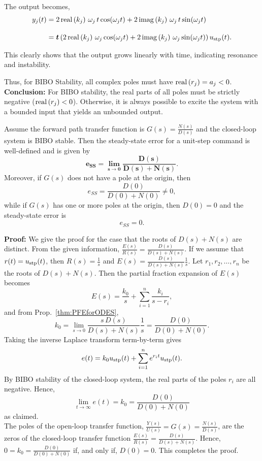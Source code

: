 \begin{itemize}
The output becomes,
\[
\begin{aligned}
y_j(t) &= 2 \, \mathrm{real} \left( k_j \right) \, \omega_j \, t \cos(\omega_j t) + 2 \, \mathrm{imag} \left( k_j \right) \, \omega_j \, t \sin(\omega_j t) \\[1em]
&= \bm{t} \left( 2 \, \mathrm{real} \left( k_j \right) \, \omega_j \cos(\omega_j t) + 2 \, \mathrm{imag} \left( k_j \right) \, \omega_j \sin(\omega_j t) \right) u_{\rm stp}(t).
\end{aligned}
\]

This clearly shows that the output grows linearly with time, indicating resonance and instability.

\end{itemize}



Thus, for BIBO Stability, all complex poles must have \(\mathrm{real} \left( r_j \right) = a_j < 0\).\\

\textbf{Conclusion:} For BIBO stability, the real parts of all poles must be strictly negative (\(\mathrm{real} \left( r_j \right) < 0\)). Otherwise, it is always possible to excite the system with a bounded input that yields an unbounded output.

\Qed

\bigskip

\begin{tcolorbox}[title=\textcolor{black}{Proof of Prop.~\ref{thm:ESS} (Steady-State Error for Step Inputs Applied to BIBO Stable Closed-Loop Systems)}, sharp corners, colback=green!30, colframe=green!80!blue, breakable, fonttitle=\bfseries]
    Assume the forward path transfer function is $G(s) = \frac{N(s)}{D(s)}$ and the closed-loop system is BIBO stable. Then the steady-state error for a unit-step command is well-defined and is given by
\begin{equation}
\bm{e_{SS} =\lim_{s \to 0} \frac{D(s)} {D(s) + N(s)}}.
\end{equation}
Moreover, if $G(s)$ does not have a pole at the origin, then
$$e_{SS} =\frac{D(0)}{D(0) + N(0)}\not = 0,$$
while if $G(s)$ has one or more poles at the origin, then $D(0)=0$ and the steady-state error is 
$$e_{SS} = 0.$$
\end{tcolorbox}

\textbf{Proof:} We give the proof for the case that the roots of $D(s) + N(s)$ are distinct. From the given information, $\frac{E(s)}{R(s)} = \frac{D(s)}{D(s) + N(s)}$. If we assume that $r(t) = u_{\rm stp}(t)$, then $R(s) = \frac{1}{s}$ and
$E(s) = \frac{D(s)}{D(s) + N(s)} \frac{1}{s}$. Let $r_1, r_2, \ldots, r_n$ be the roots of $D(s) + N(s)$. Then the partial fraction expansion of $E(s)$ becomes
$$E(s) = \frac{k_0}{s} + \sum_{i=1}^n \frac{k_i}{s-r_i},$$
and from Prop.~\ref{thm:PFEforODES},
$$k_0 = \lim_{s \to 0}\frac{s \, D(s)}{D(s) + N(s)}  \frac{1}{s} = \frac{D(0)}{D(0) + N(0)}.$$
Taking the inverse Laplace transform term-by-term gives
$$e(t) = k_0 u_{\rm stp}(t) + \sum_{i=1}^n e^{r_i t} u_{\rm stp}(t).$$
By BIBO stability of the closed-loop system, the real parts of the poles $r_i$ are all negative. Hence, 
$$\lim_{t \to \infty} e(t) = k_0 = \frac{D(0)}{D(0) + N(0)}$$
as claimed. \\

The poles of the open-loop transfer function, $\frac{Y(s)}{U(s)} = G(s) = \frac{N(s)}{D(s)}$, are the zeros of the closed-loop transfer function $\frac{E(s)}{R(s)} = \frac{D(s)}{D(s) + N(s)}$. Hence, $0=k_0 =\frac{D(0)}{D(0) + N(0)}$ if, and only if, $D(0) = 0$. This completes the proof.
\Qed




